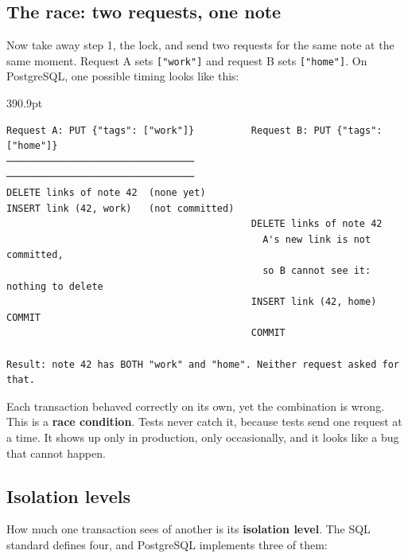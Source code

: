 \subsection*{The race: two requests, one note}\label{33-logic-execution:the-race-two-requests-one-note}

Now take away step 1, the lock, and send two requests for the same note at the same moment. Request A sets \texttt{{[}"work"{]}} and request B sets \texttt{{[}"home"{]}}. On PostgreSQL, one possible timing looks like this:

\begin{diagrambox}[short]{390.9pt}
\begin{Verbatim}[fontsize=\fontsize{9.0}{8.55}\selectfont]
Request A: PUT {"tags": ["work"]}          Request B: PUT {"tags": ["home"]}
─────────────────────────────────          ─────────────────────────────────
DELETE links of note 42  (none yet)
INSERT link (42, work)   (not committed)
                                           DELETE links of note 42
                                             A's new link is not committed,
                                             so B cannot see it: nothing to delete
                                           INSERT link (42, home)
COMMIT
                                           COMMIT

Result: note 42 has BOTH "work" and "home". Neither request asked for that.
\end{Verbatim}
\end{diagrambox}

\noindent{}Each transaction behaved correctly on its own, yet the combination is wrong. This is a \textbf{race condition}. Tests never catch it, because tests send one request at a time. It shows up only in production, only occasionally, and it looks like a bug that cannot happen.

\subsection*{Isolation levels}\label{33-logic-execution:isolation-levels}

How much one transaction sees of another is its \textbf{isolation level}. The SQL standard defines four, and PostgreSQL implements three of them:


